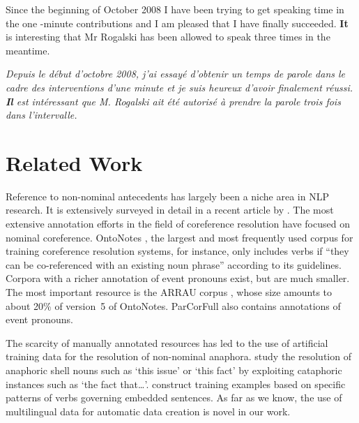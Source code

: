 \documentclass[10pt, a4paper]{article}
\begin{document}
\begin{enumerate}
Since the beginning of October 2008 I have been trying to get speaking time in
the one -minute contributions and I am pleased that I have finally succeeded.
\textbf{It} is interesting that Mr Rogalski has been allowed to speak three times in the meantime. 


\textit{Depuis le début d'octobre 2008, j'ai essayé d'obtenir un temps de parole
dans le cadre des interventions d'une minute et je suis heureux d'avoir
finalement réussi. \textbf{Il} est intéressant que M. Rogalski ait été autorisé à prendre la parole trois fois dans l'intervalle.}





\end{enumerate}



\section{Related Work}

Reference to non-nominal antecedents has largely been a niche area in NLP
research. It is extensively surveyed in detail in a recent article by
. The most extensive annotation efforts in
the field of coreference resolution have focused on nominal coreference.
OntoNotes \cite{Pradhan:2013}, the largest and most frequently used corpus for
training coreference resolution systems, for instance, only includes verbs if
``they can be co-referenced with an existing noun phrase'' according to its
guidelines. Corpora with a richer annotation of event pronouns exist, but are
much smaller. The most important resource is the ARRAU corpus
\cite{poesio-etal-2018-anaphora}, whose size amounts to about 20\% of version~5
of OntoNotes. ParCorFull \cite{Lapshinova-Koltunski-Hardmeier-Krielke2018} also
contains annotations of event pronouns.

The scarcity of manually annotated resources has led to the use of artificial
training data for the resolution of non-nominal anaphora.
 study the resolution of anaphoric
shell nouns such as `this issue' or `this fact' by exploiting
cataphoric instances such as `the fact that\ldots'.
 construct training examples based on
specific patterns of verbs governing embedded sentences. As far as we know, the
use of multilingual data for automatic data creation is novel in our work.
\end{document}
